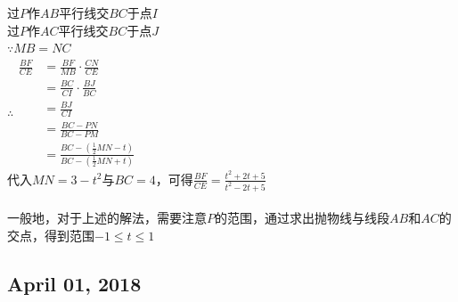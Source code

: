 \documentclass[12pt]{article}
\begin{document}
			过$P$作$AB$平行线交$BC$于点$I$\\
			过$P$作$AC$平行线交$BC$于点$J$\\
			$\because{}MB=NC$\\
			$\therefore{}\begin{aligned}
　　　　	\frac{BF}{CE}&=\frac{BF}{MB}\cdot\frac{CN}{CE}\\
　　　　	&=\frac{BC}{CI}\cdot\frac{BJ}{BC}\\
　　　　	&=\frac{BJ}{CI}\\
　　　　	&=\frac{BC-PN}{BC-PM}\\
　　　　	&=\frac{BC-(\frac{1}{2}MN-t)}{BC-(\frac{1}{2}MN+t)}
　　　　\end{aligned}$\\
			代入$MN=3-t^{2}$与$BC=4$，可得$\frac{BF}{CE}=\frac{t^{2}+2t+5}{t^{2}-2t+5}$\\
			\\
			一般地，对于上述的解法，需要注意$P$的范围，通过求出抛物线与线段$AB$和$AC$的交点，得到范围$-1\leqslant{}t\leqslant{}1$
	\subsection{April 01, 2018}
\end{document}
